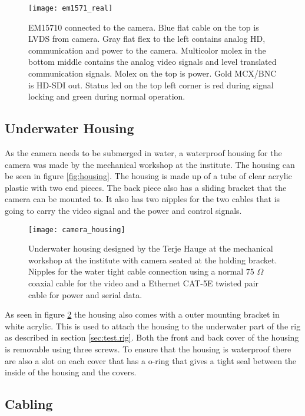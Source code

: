 \begin{figure}
 	\centering
 	\texttt{[image: em1571\_real]}
 	\caption{EM15710 connected to the camera. Blue flat cable on the top is LVDS from camera. Gray flat flex to the left contains 
 		analog HD, communication and power to the camera. Multicolor molex in the bottom middle contains the analog video signals and level translated communication signals. Molex on the top is power. Gold MCX/BNC is HD-SDI out. Status led on the top left corner is red during signal locking and green during normal operation.}
 	\label{fig:hd-sdi.card}
\end{figure}

\subsection{Underwater Housing}
As the camera needs to be submerged in water, a waterproof housing for the camera was made by the mechanical workshop at the institute. The housing can 
be seen in figure \vref{fig:housing}. The housing is made up of a tube of clear acrylic plastic with two end pieces. The back piece also
has a sliding bracket that the camera can be mounted to. It also has two nipples for the two cables that is going to carry the video signal and 
the power and control signals. 

\begin{figure}
 	\centering
 	\texttt{[image: camera\_housing]}
 	\caption{Underwater housing designed by the Terje Hauge at the mechanical workshop at the institute with camera seated at the holding bracket. Nipples for the 
 		water tight cable connection using a normal 75 $\Omega$ coaxial cable for the video and a Ethernet CAT-5E twisted pair cable for power and serial data.}
 	\label{fig:housing}
\end{figure}

As seen in figure \ref{fig:housing} the housing also comes with a outer mounting bracket in white acrylic. This is used to attach the housing to the underwater 
part of the rig as described in section \vref{sec:test.rig}. Both the front and back cover of the housing is removable using three screws. To ensure that 
the housing is waterproof there are also a slot on each cover that has a o-ring that gives a tight seal between the inside of the housing and the covers.

\subsection{Cabling}

